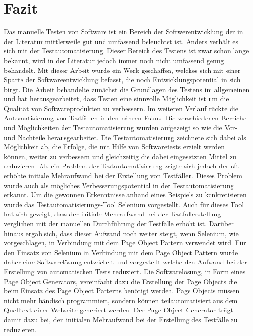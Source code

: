 \chapter{Fazit}
\label{sec:fazit}
Das manuelle Testen von Software ist ein Bereich der Softwerentwicklung der in der Literatur mittlerweile gut und umfassend beleuchtet ist. Anders verhält es sich mit der Testautomatisierung. Dieser Bereich des Testens ist zwar schon lange bekannt, wird in der Literatur jedoch immer noch nicht umfassend genug behandelt. Mit dieser Arbeit wurde ein Werk geschaffen, welches sich mit einer Sparte der Softwareentwicklung befasst, die noch Entwicklungspotential in sich birgt. 
Die Arbeit behandelte zunächst die Grundlagen des Testens im allgemeinen und hat herausgearbeitet, dass Testen eine sinnvolle Möglichkeit ist um die Qualität von Softwareprodukten zu verbessern. 
Im weiteren Verlauf rückte die Automatisierung von Testfällen in den nähren Fokus. Die verschiedenen Bereiche und Möglichkeiten der Testautomatisierung wurden aufgezeigt so wie die Vor- und Nachteile herausgearbeitet.
Die Testautomatisierung zeichnete sich dabei als Möglichkeit ab, die Erfolge, die mit Hilfe von Softwaretests erzielt werden können, weiter zu verbessern und gleichzeitig die dabei eingesetzten Mittel zu reduzieren. Als ein Problem der Testautomatisierung zeigte sich jedoch der oft erhöhte initiale Mehraufwand bei der Erstellung von Testfällen. Dieses Problem wurde auch als mögliches Verbesserungspotential in der Testautomatisierung erkannt.
Um die gewonnen Erkenntnisse anhand eines Beispiels zu konkretisieren wurde das Testautomatisierungs-Tool Selenium vorgestellt.
Auch für dieses Tool hat sich gezeigt, dass der initiale Mehraufwand bei der Testfallerstellung verglichen mit der manuellen Durchführung der Testfälle erhöht ist. Darüber hinaus ergab sich, dass dieser Aufwand noch weiter steigt, wenn Selenium, wie vorgeschlagen, in Verbindung mit dem Page Object Pattern verwendet wird.
Für den Einsatz von Selenium in Verbindung mit dem Page Object Pattern wurde daher eine Softwarelösung entwickelt und vorgestellt welche den Aufwand bei der Erstellung von automatischen Tests reduziert.
Die Softwarelösung, in Form eines Page Object Generators, vereinfacht dazu die Erstellung der Page Objects die beim Einsatz des Page Object Patterns benötigt werden. Page Objects müssen nicht mehr händisch programmiert, sondern können teilautomatisiert aus dem Quelltext einer Webseite generiert werden. Der Page Object Generator trägt damit dazu bei, den initialen Mehraufwand bei der Erstellung des Testfälle zu reduzieren.

